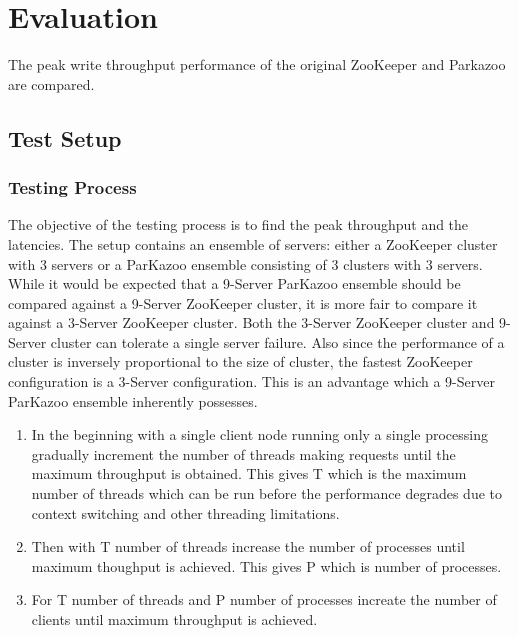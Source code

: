 \chapter{Evaluation}

The peak write throughput performance of the original ZooKeeper and Parkazoo are compared.

\section{Test Setup}


\subsection{Testing Process}
The objective of the testing process is to find the peak throughput and the latencies. The setup contains an ensemble of servers: either a ZooKeeper cluster with 3 servers or a ParKazoo ensemble consisting of 3 clusters with 3 servers. While it would be expected that a 9-Server ParKazoo ensemble should be compared against a 9-Server ZooKeeper cluster, it is more fair to compare it against a 3-Server ZooKeeper cluster. Both the 3-Server ZooKeeper cluster and 9-Server cluster can tolerate a single server failure. Also since the performance of a cluster is inversely proportional to the size of cluster, the fastest ZooKeeper configuration is a 3-Server configuration. This is an advantage which a 9-Server ParKazoo ensemble inherently possesses.

\begin{enumerate}
  \item In the beginning with a single client node running only a single processing gradually increment the number of threads making requests until the maximum throughput is obtained. This gives T which is the maximum number of threads which can be run before the performance degrades due to context switching and other threading limitations.
  \item Then with T number of threads increase the number of processes until maximum thoughput is achieved. This gives P which is number of processes.
  \item For T number of threads and P number of processes increate the number of clients until maximum throughput is achieved.
\end{enumerate}




